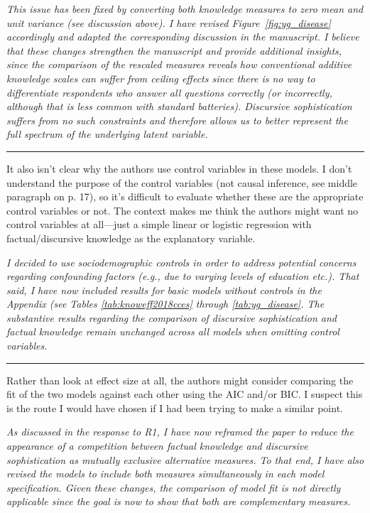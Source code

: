 \textit{This issue has been fixed by converting both knowledge measures to zero mean and unit variance (see discussion above). I have revised Figure~\ref{fig:yg_disease} accordingly and adapted the corresponding discussion in the manuscript. I believe that these changes strengthen the manuscript and provide additional insights, since the comparison of the rescaled measures reveals how conventional additive knowledge scales can suffer from ceiling effects since there is no way to differentiate respondents who answer all questions correctly (or incorrectly, although that is less common with standard batteries). Discursive sophistication suffers from no such constraints and therefore allows us to better represent the full spectrum of the underlying latent variable.}


\rule{\linewidth}{.01cm}

It also isn’t clear why the authors use control variables in these models. I don’t understand the purpose of the control variables (not causal inference, see middle paragraph on p. 17), so it’s difficult to evaluate whether these are the appropriate control variables or not. The context makes me think the authors might want no control variables at all—just a simple linear or logistic regression with factual/discursive knowledge as the explanatory variable.

\textit{I decided to use sociodemographic controls in order to address potential concerns regarding confounding factors (e.g., due to varying levels of education etc.). That said, I have now included results for basic models without controls in the Appendix (see Tables \ref{tab:knoweff2018cces} through \ref{tab:yg_disease}. The substantive results regarding the comparison of discursive sophistication and factual knowledge remain unchanged across all models when omitting control variables.}


\rule{\linewidth}{.01cm}

Rather than look at effect size at all, the authors might consider comparing the fit of the two models against each other using the AIC and/or BIC. I suspect this is the route I would have chosen if I had been trying to make a similar point.

\textit{As discussed in the response to R1, I have now reframed the paper to reduce the appearance of a competition between factual knowledge and discursive sophistication as mutually exclusive alternative measures. To that end, I have also revised the models to include both measures simultaneously in each model specification. Given these changes, the comparison of model fit is not directly applicable since the goal is now to show that both are complementary measures.}

